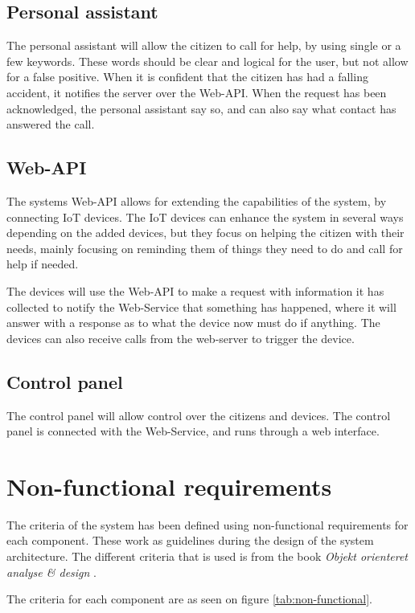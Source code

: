 \subsection{Personal assistant}
The personal assistant will allow the citizen to call for help, by using single or a few keywords. These words should be clear and logical for the user, but not allow for a false positive. When it is confident that the citizen has had a falling accident, it notifies the server over the Web-API. When the request has been acknowledged, the personal assistant say so, and can also say what contact has answered the call.

\subsection{Web-API}
The systems Web-API allows for extending the capabilities of the system, by connecting IoT devices. The IoT devices can enhance the system in several ways depending on the added devices, but they focus on helping the citizen with their needs, mainly focusing on reminding them of things they need to do and call for help if needed. 

The devices will use the Web-API to make a request with information it has collected to notify the Web-Service that something has happened, where it will answer with a response as to what the device now must do if anything. The devices can also receive calls from the web-server to trigger the device.


\subsection{Control panel}
The control panel will allow control over the citizens and devices. The control panel is connected with the Web-Service, and runs through a web interface. 


\section{Non-functional requirements}
\label{sec:non-requirements}
The criteria of the system has been defined using non-functional requirements for each component. These work as guidelines during the design of the system architecture. The different criteria that is used is from the book \textit{Objekt orienteret analyse \& design} \cite{subook}.

The criteria for each component are as seen on figure \ref{tab:non-functional}.



